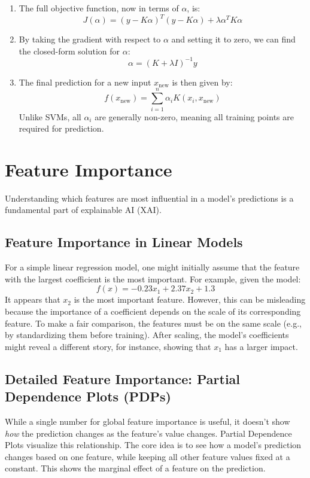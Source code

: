 \documentclass{article}
\begin{document}
\begin{multicols}{2}
\begin{enumerate}
		\item The full objective function, now in terms of $\alpha$, is:
		      \[
			      J(\alpha) = (y - K\alpha)^T (y - K\alpha) + \lambda \alpha^T K \alpha
		      \]

		\item By taking the gradient with respect to $\alpha$ and setting it to zero, we can find the closed-form solution for $\alpha$:
		      \[
			      \alpha = (K+\lambda I)^{-1}y
		      \]

		\item The final prediction for a new input $x_{\text{new}}$ is then given by:
		      \[
			      f(x_{\text{new}}) = \sum_{i=1}^n \alpha_i K(x_i, x_{\text{new}})
		      \]
		      Unlike SVMs, all $\alpha_i$ are generally non-zero, meaning all training points are required for prediction.
	\end{enumerate}

	\section{Feature Importance}
	Understanding which features are most influential in a model's predictions is a fundamental part of explainable AI (XAI).

	\subsection{Feature Importance in Linear Models}
	For a simple linear regression model, one might initially assume that the feature with the largest coefficient is the most important. For example, given the model:
	$$ f(x) = -0.23x_{1} + 2.37x_{2} + 1.3 $$
	It appears that $x_2$ is the most important feature. However, this can be misleading because the importance of a coefficient depends on the scale of its corresponding feature. To make a fair comparison, the features must be on the same scale (e.g., by standardizing them before training). After scaling, the model's coefficients might reveal a different story, for instance, showing that $x_1$ has a larger impact.

	\subsection{Detailed Feature Importance: Partial Dependence Plots (PDPs)}
	While a single number for global feature importance is useful, it doesn't show \textit{how} the prediction changes as the feature's value changes. Partial Dependence Plots visualize this relationship. The core idea is to see how a model's prediction changes based on one feature, while keeping all other feature values fixed at a constant. This shows the marginal effect of a feature on the prediction.


\end{multicols}
\end{document}
